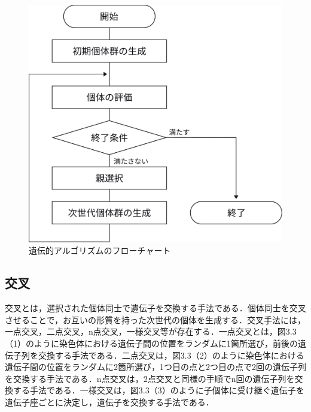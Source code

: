 \begin{figure}[htbp]
	\begin{center}
		\includegraphics[scale=0.3]{image/flowchart.pdf}
		\caption{遺伝的アルゴリズムのフローチャート}
	\end{center}
\end{figure}

\subsection{交叉}
交叉とは，選択された個体同士で遺伝子を交換する手法である．個体同士を交叉させることで，お互いの形質を持った次世代の個体を生成する．交叉手法には，一点交叉，二点交叉，n点交叉，一様交叉等が存在する．一点交叉とは，図3.3（1）のように染色体における遺伝子間の位置をランダムに1箇所選び，前後の遺伝子列を交換する手法である．二点交叉は，図3.3（2）のように染色体における遺伝子間の位置をランダムに2箇所選び，1つ目の点と2つ目の点で2回の遺伝子列を交換する手法である．n点交叉は，2点交叉と同様の手順でn回の遺伝子列を交換する手法である．一様交叉は，図3.3（3）のように子個体に受け継ぐ遺伝子を遺伝子座ごとに決定し，遺伝子を交換する手法である．

